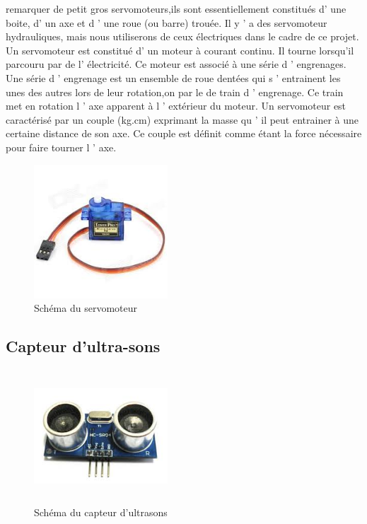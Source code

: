 \documentclass[12pt, openany]{report}
\begin{document}
  remarquer de petit gros servomoteurs,ils sont essentiellement constitués d’ une boite, d’ un axe et d ’ une roue (ou barre) trouée. Il y ’ a des servomoteur hydrauliques, mais nous utiliserons de ceux électriques dans le cadre de ce projet. Un servomoteur est constitué d’ un moteur à courant continu. Il tourne lorsqu'il parcouru par de l’ électricité. Ce moteur est associé à une série d ’ engrenages. Une série d ’ engrenage est un ensemble de roue dentées qui s ’ entrainent les unes des autres lors de leur rotation,on par le de train d ’ engrenage. Ce train met en rotation l ’ axe apparent à l ’ extérieur du moteur. Un servomoteur est caractérisé par un couple (kg.cm) exprimant la masse qu ’ il peut entrainer à une certaine distance de son axe. Ce couple est définit comme étant la force nécessaire pour faire tourner l ’ axe.
     \begin{figure}[!h]
                     \centering
    \includegraphics[height=5cm,width=5cm]{composantes/servomoteur.jpg} 
              \caption{Schéma du servomoteur}
                    		          		
     \end{figure}    									\subsection{Capteur d'ultra-sons}
     	
      \begin{figure}[!h]
                          \centering
         \includegraphics[height=5cm,width=5cm]{composantes/ultrasons.png} 
                   \caption{Schéma du capteur d'ultrasons}
                         		          		
          \end{figure}
\end{document}

